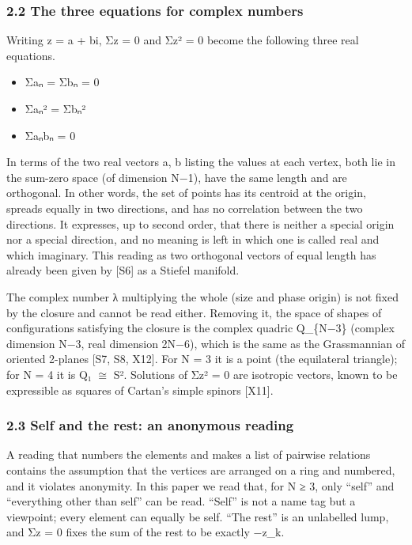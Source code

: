 \documentclass[
  a4paper,
]{article}
\providecommand{\tightlist}{%
  \setlength{\itemsep}{0pt}\setlength{\parskip}{0pt}}
\begin{document}
\subsubsection{2.2 The three equations for complex
numbers}\label{the-three-equations-for-complex-numbers}

Writing z = a + bi, Σz = 0 and Σz² = 0 become the following three real
equations.

\begin{itemize}
\tightlist
\item
  Σaₙ = Σbₙ = 0
\item
  Σaₙ² = Σbₙ²
\item
  Σaₙbₙ = 0
\end{itemize}

In terms of the two real vectors a, b listing the values at each vertex,
both lie in the sum-zero space (of dimension N−1), have the same length
and are orthogonal. In other words, the set of points has its centroid
at the origin, spreads equally in two directions, and has no correlation
between the two directions. It expresses, up to second order, that there
is neither a special origin nor a special direction, and no meaning is
left in which one is called real and which imaginary. This reading as
two orthogonal vectors of equal length has already been given by
{[}S6{]} as a Stiefel manifold.

The complex number λ multiplying the whole (size and phase origin) is
not fixed by the closure and cannot be read either. Removing it, the
space of shapes of configurations satisfying the closure is the complex
quadric Q\_\{N−3\} (complex dimension N−3, real dimension 2N−6), which
is the same as the Grassmannian of oriented 2-planes {[}S7, S8, X12{]}.
For N = 3 it is a point (the equilateral triangle); for N = 4 it is Q₁
\(\cong\) S². Solutions of Σz² = 0 are isotropic vectors, known to be
expressible as squares of Cartan's simple spinors {[}X11{]}.

\subsubsection{2.3 Self and the rest: an anonymous
reading}\label{self-and-the-rest-an-anonymous-reading}

A reading that numbers the elements and makes a list of pairwise
relations contains the assumption that the vertices are arranged on a
ring and numbered, and it violates anonymity. In this paper we read
that, for N ≥ 3, only ``self'' and ``everything other than self'' can be
read. ``Self'' is not a name tag but a viewpoint; every element can
equally be self. ``The rest'' is an unlabelled lump, and Σz = 0 fixes
the sum of the rest to be exactly −z\_k.
\end{document}
